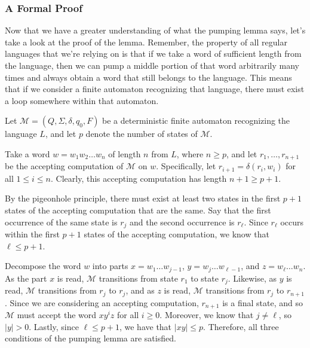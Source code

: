\subsubsection*{A Formal Proof}

Now that we have a greater understanding of what the pumping lemma says, let's take a look at the proof of the lemma. Remember, the property of all regular languages that we're relying on is that if we take a word of sufficient length from the language, then we can pump a middle portion of that word arbitrarily many times and always obtain a word that still belongs to the language. This means that if we consider a finite automaton recognizing that language, there must exist a loop somewhere within that automaton.

\begin{proofbox}
Let $\mathcal{M} = (Q, \Sigma, \delta, q_{0}, F)$ be a deterministic finite automaton recognizing the language $L$, and let $p$ denote the number of states of $\mathcal{M}$.

Take a word $w = w_{1}w_{2} \dots w_{n}$ of length $n$ from $L$, where $n \geq p$, and let $r_{1}, \dots, r_{n+1}$ be the accepting computation of $\mathcal{M}$ on $w$. Specifically, let $r_{i+1} = \delta(r_{i}, w_{i})$ for all $1 \leq i \leq n$. Clearly, this accepting computation has length $n+1 \geq p+1$.

By the pigeonhole principle, there must exist at least two states in the first $p+1$ states of the accepting computation that are the same. Say that the first occurrence of the same state is $r_{j}$ and the second occurrence is $r_{\ell}$. Since $r_{\ell}$ occurs within the first $p+1$ states of the accepting computation, we know that $\ell \leq p+1$.

Decompose the word $w$ into parts $x = w_{1} \dots w_{j-1}$, $y = w_{j} \dots w_{\ell-1}$, and $z = w_{\ell} \dots w_{n}$. As the part $x$ is read, $\mathcal{M}$ transitions from state $r_{1}$ to state $r_{j}$. Likewise, as $y$ is read, $\mathcal{M}$ transitions from $r_{j}$ to $r_{j}$, and as $z$ is read, $\mathcal{M}$ transitions from $r_{j}$ to $r_{n+1}$. Since we are considering an accepting computation, $r_{n+1}$ is a final state, and so $\mathcal{M}$ must accept the word $xy^{i}z$ for all $i \geq 0$. Moreover, we know that $j \neq \ell$, so $|y| > 0$. Lastly, since $\ell \leq p+1$, we have that $|xy| \leq p$. Therefore, all three conditions of the pumping lemma are satisfied.
\end{proofbox}

